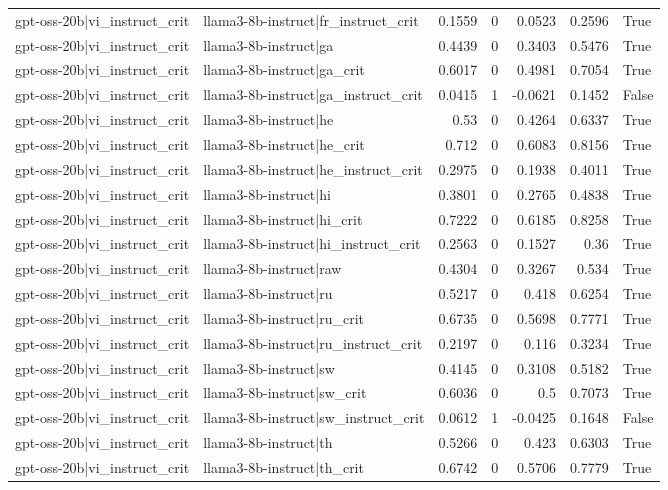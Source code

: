\begin{table}
\begin{tabular}{l l r r r r l}
gpt-oss-20b|vi_instruct_crit & llama3-8b-instruct|fr_instruct_crit & 0.1559 & 0 & 0.0523 & 0.2596 & True \\
gpt-oss-20b|vi_instruct_crit & llama3-8b-instruct|ga & 0.4439 & 0 & 0.3403 & 0.5476 & True \\
gpt-oss-20b|vi_instruct_crit & llama3-8b-instruct|ga_crit & 0.6017 & 0 & 0.4981 & 0.7054 & True \\
gpt-oss-20b|vi_instruct_crit & llama3-8b-instruct|ga_instruct_crit & 0.0415 & 1 & -0.0621 & 0.1452 & False \\
gpt-oss-20b|vi_instruct_crit & llama3-8b-instruct|he & 0.53 & 0 & 0.4264 & 0.6337 & True \\
gpt-oss-20b|vi_instruct_crit & llama3-8b-instruct|he_crit & 0.712 & 0 & 0.6083 & 0.8156 & True \\
gpt-oss-20b|vi_instruct_crit & llama3-8b-instruct|he_instruct_crit & 0.2975 & 0 & 0.1938 & 0.4011 & True \\
gpt-oss-20b|vi_instruct_crit & llama3-8b-instruct|hi & 0.3801 & 0 & 0.2765 & 0.4838 & True \\
gpt-oss-20b|vi_instruct_crit & llama3-8b-instruct|hi_crit & 0.7222 & 0 & 0.6185 & 0.8258 & True \\
gpt-oss-20b|vi_instruct_crit & llama3-8b-instruct|hi_instruct_crit & 0.2563 & 0 & 0.1527 & 0.36 & True \\
gpt-oss-20b|vi_instruct_crit & llama3-8b-instruct|raw & 0.4304 & 0 & 0.3267 & 0.534 & True \\
gpt-oss-20b|vi_instruct_crit & llama3-8b-instruct|ru & 0.5217 & 0 & 0.418 & 0.6254 & True \\
gpt-oss-20b|vi_instruct_crit & llama3-8b-instruct|ru_crit & 0.6735 & 0 & 0.5698 & 0.7771 & True \\
gpt-oss-20b|vi_instruct_crit & llama3-8b-instruct|ru_instruct_crit & 0.2197 & 0 & 0.116 & 0.3234 & True \\
gpt-oss-20b|vi_instruct_crit & llama3-8b-instruct|sw & 0.4145 & 0 & 0.3108 & 0.5182 & True \\
gpt-oss-20b|vi_instruct_crit & llama3-8b-instruct|sw_crit & 0.6036 & 0 & 0.5 & 0.7073 & True \\
gpt-oss-20b|vi_instruct_crit & llama3-8b-instruct|sw_instruct_crit & 0.0612 & 1 & -0.0425 & 0.1648 & False \\
gpt-oss-20b|vi_instruct_crit & llama3-8b-instruct|th & 0.5266 & 0 & 0.423 & 0.6303 & True \\
gpt-oss-20b|vi_instruct_crit & llama3-8b-instruct|th_crit & 0.6742 & 0 & 0.5706 & 0.7779 & True \\

\end{tabular}
\end{table}
